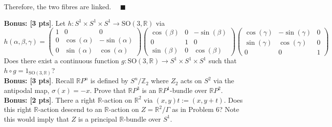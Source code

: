 \documentclass[12pt]{article}
\newcommand{\Z}{\mathbb{Z}}
\newcommand{\R}{\mathbb{R}}
\newcommand{\SO}{\text{SO}}
\newcommand{\lra}{\longrightarrow}
\newcommand{\RP}{\mathbb{R}P}
\newcommand{\qed}{\quad \blacksquare}
\begin{document}
        Therefore, the two fibres are linked. $\qed$ 
\color{black}


\pagebreak

\textbf{Bonus: [3 pts]}.  Let $h: S^{1}\times S^{1} \times S^{1} \lra \SO(3,\R)$ via
\[
h(\alpha,\beta,\gamma) = \left( 
\begin{array}{ccc}
1 & 0 & 0 \\
0 & \cos(\alpha) &-\sin(\alpha) \\
0 & \sin(\alpha) & \cos(\alpha)
\end{array}
\right)
\left(
\begin{array}{ccc}
\cos(\beta) & 0 & -\sin(\beta) \\
0 & 1&0  \\
\sin(\beta) & 0 & \cos(\beta)
\end{array}
\right)
\left(
\begin{array}{ccc}
\cos(\gamma) & -\sin(\gamma) & 0 \\
\sin(\gamma) & \cos(\gamma) &0 \\
0 & 0 & 1
\end{array}
\right)
\] 
Does there exist a continuous function $g: \SO(3,\R) \lra S^{1} \times S^{1} \times S^{1}$ such that $h \circ g = 1_{\SO(3,\R)}$?  \\

\textbf{Bonus: [3 pts]}.  Recall $\RP^{n}$ is defined by $S^{n}/\Z_{2}$ where $Z_{2}$ acts on $S^{2}$ via the antipodal map, $\sigma(x) = -x$.  Prove that $\RP^{3}$ is an $\RP^{1}$-bundle over $\RP^{2}$.  \\

\textbf{Bonus: [2 pts]}.  There a right $\R$-action on $\R^{2}$ via $(x,y)t:= (x,y+t)$.  Does this right $\R$-action descend to an $\R$-action on $Z = \R^{2}/\Gamma$ as in Problem 6?  Note this would imply that $Z$ is a principal $\R$-bundle over $S^{1}$.  
\end{document}
